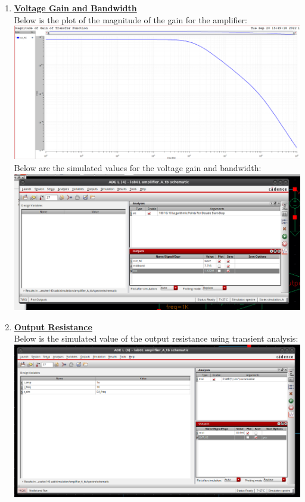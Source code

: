 \documentclass[12pt, fleqn]{article}
\begin{document}
\begin{enumerate}
    \item
    {
    \textbf{\underline{Voltage Gain and Bandwidth}}\\[0.25cm]
    Below is the plot of the magnitude of the gain for the amplifier:\\[0.1cm]
    \includegraphics[scale=0.35, center]{a_plot.png}\\[1cm]
    Below are the simulated values for the voltage gain and bandwidth:\\[0.1cm]
    \includegraphics[scale=0.55, center]{a_gbw.png}\\
    }
    \newpage
    \item
    {
    \textbf{\underline{Output Resistance}}\\[0.25cm]
    Below is the simulated value of the output resistance using transient analysis:\\[0.1cm]
    \includegraphics[scale=0.5, center]{a_rout.png}\\[0.5cm]
}
\end{enumerate}
\end{document}

